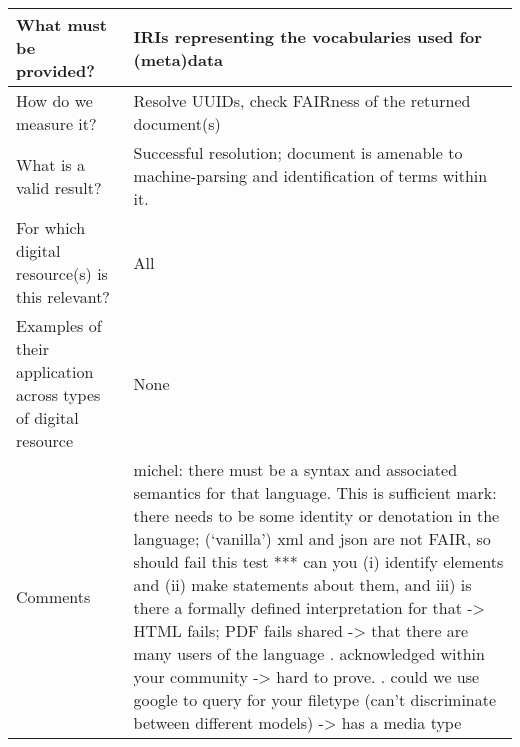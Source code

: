 \documentclass[english]{article}
\begin{document}
\begin{longtable}{|p{5cm}|p{9cm}|}
\\



\hline
What must be provided? &  


IRIs representing the vocabularies used for (meta)data 


\\



\hline
How do we measure it? &  


Resolve UUIDs, check FAIRness of the returned document(s)


\\



\hline
What is a valid result? &  



Successful resolution; document is amenable to machine-parsing and identification of terms within it.



\\



\hline
For which digital resource(s) is this relevant? &  All\\



\hline
Examples of their application across types of digital resource &  None

\\



\hline

Comments & 

michel: there must be a syntax and associated semantics for that language.  This is sufficient \newline 
mark: there needs to be some identity or denotation in the language; (‘vanilla’) xml and json are not FAIR, so should fail this test\newline 
\newline 
*** can you (i) identify elements and (ii) make statements about them, and iii) is there a formally defined interpretation for that 
 -> HTML fails; PDF fails
\newline 
shared\newline 
-> that there are many users of the language\newline 
. acknowledged within your community\newline 
 -> hard to prove.\newline 
. could we use google to query for your filetype (can’t discriminate between different models)\newline 
-> has a media type\newline 


\end{longtable}
\end{document}
